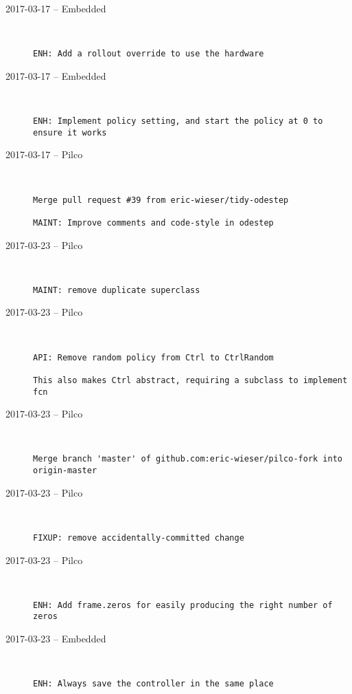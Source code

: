 \begin{description}
  \item[2017-03-17 -- Embedded] \hfill \
\begin{lstlisting}
ENH: Add a rollout override to use the hardware
\end{lstlisting}


  \item[2017-03-17 -- Embedded] \hfill \
\begin{lstlisting}
ENH: Implement policy setting, and start the policy at 0 to ensure it works
\end{lstlisting}


  \item[2017-03-17 -- Pilco] \hfill \
\begin{lstlisting}
Merge pull request #39 from eric-wieser/tidy-odestep

MAINT: Improve comments and code-style in odestep\end{lstlisting}


  \item[2017-03-23 -- Pilco] \hfill \
\begin{lstlisting}
MAINT: remove duplicate superclass
\end{lstlisting}


  \item[2017-03-23 -- Pilco] \hfill \
\begin{lstlisting}
API: Remove random policy from Ctrl to CtrlRandom

This also makes Ctrl abstract, requiring a subclass to implement fcn
\end{lstlisting}


  \item[2017-03-23 -- Pilco] \hfill \
\begin{lstlisting}
Merge branch 'master' of github.com:eric-wieser/pilco-fork into origin-master
\end{lstlisting}


  \item[2017-03-23 -- Pilco] \hfill \
\begin{lstlisting}
FIXUP: remove accidentally-committed change
\end{lstlisting}


  \item[2017-03-23 -- Pilco] \hfill \
\begin{lstlisting}
ENH: Add frame.zeros for easily producing the right number of zeros
\end{lstlisting}


  \item[2017-03-23 -- Embedded] \hfill \
\begin{lstlisting}
ENH: Always save the controller in the same place
\end{lstlisting}



\end{description}
